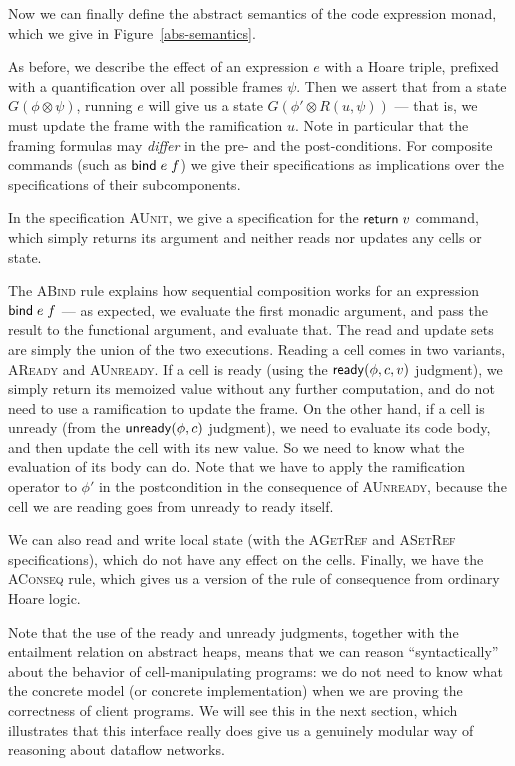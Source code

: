 Now we can finally define the abstract semantics of the code
expression monad, which we give in Figure~\ref{abs-semantics}.

As before, we describe the effect of an expression $e$ with a Hoare
triple, prefixed with a quantification over all possible frames
$\psi$. Then we assert that from a state $G(\phi \otimes \psi)$,
running $e$ will give us a state $G(\phi' \otimes R(u, \psi))$ ---
that is, we must update the frame with the ramification $u$. Note in
particular that the framing formulas may \emph{differ} in the pre- and
the post-conditions. For composite commands (such as $\mathsf{bind}\; e\;f$) we
give their specifications as implications over the specifications of
their subcomponents.

In the specification \textsc{AUnit}, we give a specification for the
$\mathsf{return}\; v$ command, which simply returns its argument and neither
reads nor updates any cells or state. 

The \textsc{ABind} rule explains how sequential composition works for
an expression $\mathsf{bind}\; e\;f$ --- as expected, we evaluate the first
monadic argument, and pass the result to the functional argument, and
evaluate that. The read and update sets are simply the union of the
two executions. Reading a cell comes in two variants, \textsc{AReady}
and \textsc{AUnready}. If a cell is ready (using the
$\mathsf{ready}({\phi}, {c}, {v})$ judgment), we simply return its memoized value
without any further computation, and do not need to use a ramification
to update the frame. On the other hand, if a cell is unready (from the
$\mathsf{unready}({\phi}, {c})$ judgment), we need to evaluate its code body, and
then update the cell with its new value. So we need to know what the
evaluation of its body can do. Note that we have to apply the
ramification operator to $\phi'$ in the postcondition in the
consequence of \textsc{AUnready}, because the cell we are reading goes
from unready to ready itself. 

We can also read and write local state (with the \textsc{AGetRef} and
\textsc{ASetRef} specifications), which do not have any effect on the
cells. Finally, we have the \textsc{AConseq} rule, which gives us a
version of the rule of consequence from ordinary Hoare logic.

Note that the use of the ready and unready judgments, together with
the entailment relation on abstract heaps, means that we can reason
``syntactically'' about the behavior of cell-manipulating programs: we
do not need to know what the concrete model (or concrete
implementation) when we are proving the correctness of client
programs. We will see this in the next section, which illustrates that
this interface really does give us a genuinely modular way of
reasoning about dataflow networks.

